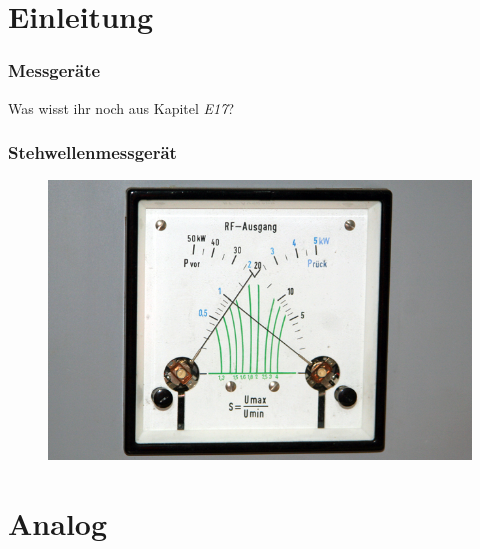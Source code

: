 

\subtitle{Technik A 16: \\
  Messtechnik \\[2em]}
\date{Stand 01.06.2017}


\section*{Einleitung}

\begin{frame}
  \frametitle{Messgeräte}
  {\Large Was wisst ihr noch aus Kapitel \emph{E17}?}
\end{frame}

\begin{frame}
  \frametitle{Stehwellenmessgerät}
  \begin{center}
    \begin{figure}
      \includegraphics[width=1\textwidth,height=.7\textheight,keepaspectratio]{a16/RS_SWR.jpg}
    \end{figure}
  \end{center}
\end{frame}

\section*{Analog}

